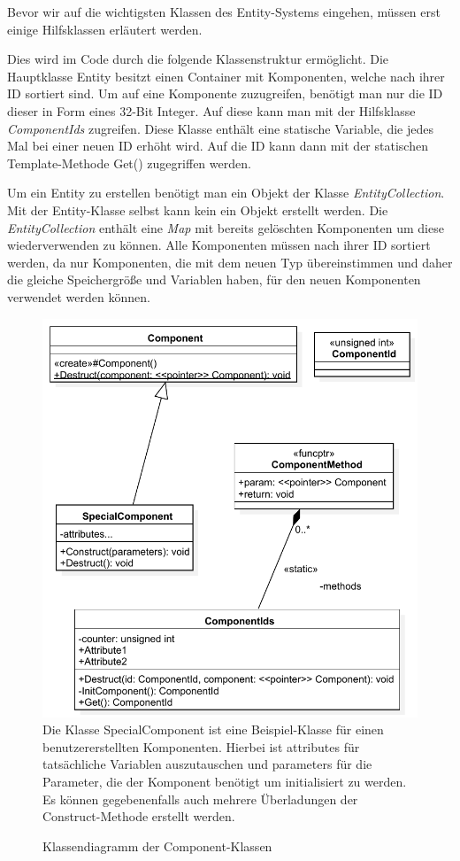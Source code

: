 Bevor wir auf die wichtigsten Klassen des Entity-Systems eingehen, müssen erst einige Hilfsklassen erläutert werden.

Dies wird im Code durch die folgende Klassenstruktur ermöglicht. Die Hauptklasse Entity besitzt einen Container mit Komponenten, welche nach ihrer ID sortiert sind. Um auf eine Komponente zuzugreifen, benötigt man nur die ID dieser in Form eines 32-Bit Integer. Auf diese kann man mit der Hilfsklasse \textit{ComponentIds} zugreifen. 
Diese Klasse enthält eine statische Variable, die jedes Mal bei einer neuen ID erhöht wird. Auf die ID kann dann mit der statischen Template-Methode Get() zugegriffen werden.
 
Um ein Entity zu erstellen benötigt man ein Objekt der Klasse \textit{EntityCollection}. Mit der Entity-Klasse selbst kann kein ein Objekt erstellt werden.  
Die \textit{EntityCollection} enthält eine \textit{Map} mit bereits gelöschten Komponenten um diese wiederverwenden zu können. 
Alle Komponenten müssen nach ihrer ID sortiert werden, da nur Komponenten, die mit dem neuen Typ übereinstimmen und daher die gleiche Speichergröße und Variablen haben, für den neuen Komponenten verwendet werden können.

\begin{figure}
	\begin{center}
		\includegraphics[width=\textwidth]{03unserprogramm/Engine/SpecialComponent.pdf}
		Die Klasse SpecialComponent ist eine Beispiel-Klasse für einen benutzererstellten Komponenten. Hierbei ist attributes für tatsächliche Variablen auszutauschen und parameters für die Parameter, die der Komponent benötigt um initialisiert zu werden. Es können gegebenenfalls auch mehrere Überladungen der Construct-Methode erstellt werden.
		\caption{Klassendiagramm der Component-Klassen}\label{ClassDiagramComponents}
	\end{center}
\end{figure}

